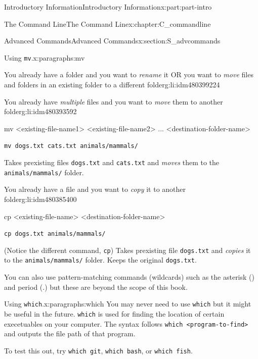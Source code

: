 \documentclass[oneside,10pt,]{book}
\newcommand{\mono}[1]{\texttt{#1}}
\begin{document}
\begin{partptx}{Introductory Information}{}{Introductory Information}{}{}{x:part:part-intro}
\begin{chapterptx}{The Command Line}{}{The Command Line}{}{}{x:chapter:C_commandline}
\begin{sectionptx}{Advanced Commands}{}{Advanced Commands}{}{}{x:section:S_advcommands}
\begin{paragraphs}{Using \mono{mv}.}{x:paragraphs:mv}
\begin{descriptionlist}
\begin{dlinarrow}{You already have a folder and you want to \emph{rename} it OR you want to \emph{move} files and folders in an existing folder to a different folder}{g:li:idm480399224}
\end{dlinarrow}%
\begin{dlinarrow}{You already have \emph{multiple} files and you want to \emph{move} them to another folder}{g:li:idm480393592}%
%
\begin{codedisplay}
mv <existing-file-name1> <existing-file-name2> ...
	<destination-folder-name>
\end{codedisplay}
%
\par
\mono{mv dogs.txt cats.txt animals/mammals/}%
\par
Takes prexisting files \mono{dogs.txt} and \mono{cats.txt} and \emph{moves} them to the \mono{animals/mammals/} folder.%
\end{dlinarrow}%
\begin{dlinarrow}{You already have a file and you want to \emph{copy} it to another folder}{g:li:idm480385400}%
%
\begin{codedisplay}
cp <existing-file-name> <destination-folder-name>
\end{codedisplay}
%
\par
\mono{cp dogs.txt animals/mammals/}%
\par
(Notice the different command, \mono{cp}) Takes prexisting file \mono{dogs.txt} and \emph{copies} it to the \mono{animals/mammals/} folder. Keeps the original \mono{dogs.txt}.%
\end{dlinarrow}%
\end{descriptionlist}
%
\par
You can also use pattern-matching commands (wildcards) such as the asterisk (\textasteriskcentered{}) and period (.) but these are beyond the scope of this book.%
\end{paragraphs}%
\begin{paragraphs}{Using \mono{which}.}{x:paragraphs:which}%
%
%
You may never need to use \mono{which} but it might be useful in the future. \mono{which} is used for finding the location of certain execetuables on your computer. The syntax follows \mono{which <program-to-find>} and outputs the file path of that program.%
\par
To test this out, try \mono{which git}, \mono{which bash}, or \mono{which fish}.%
\end{paragraphs}%
\end{sectionptx}
\end{chapterptx}
\end{partptx}
%
%
\typeout{************************************************}
\end{document}
